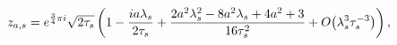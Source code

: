 \[z_{a,s}=e^{\frac{3}{4}\pi i}\sqrt{2\tau_{s}}\left(1-\frac{ia\lambda_{s}}{2\tau%
_{s}}+\frac{2a^{2}\lambda_{s}^{2}-8a^{2}\lambda_{s}+4a^{2}+3}{16\tau_{s}^{2}}+%
\mathop{O\/}\nolimits\!\left(\lambda_{s}^{3}\tau_{s}^{-3}\right)\right),\]